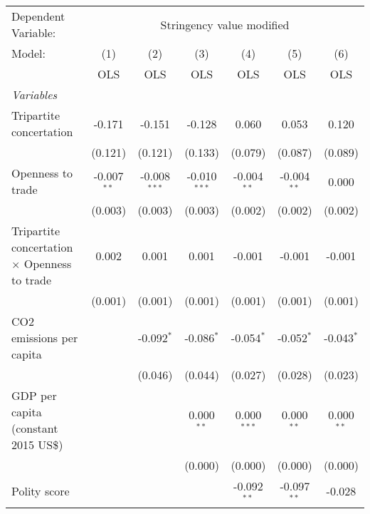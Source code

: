 
\begingroup
\centering
\begin{tabular}{lcccccc}
   \toprule
   Dependent Variable: & \multicolumn{6}{c}{Stringency value modified}\\
   Model:                                              & (1)           & (2)            & (3)            & (4)           & (5)           & (6)\\  
                                                       &  OLS          & OLS            & OLS            & OLS           & OLS           & OLS\\  
   \midrule
   \emph{Variables}\\
   Tripartite concertation                             & -0.171        & -0.151         & -0.128         & 0.060         & 0.053         & 0.120\\   
                                                       & (0.121)       & (0.121)        & (0.133)        & (0.079)       & (0.087)       & (0.089)\\   
   Openness to trade                                   & -0.007$^{**}$ & -0.008$^{***}$ & -0.010$^{***}$ & -0.004$^{**}$ & -0.004$^{**}$ & 0.000\\   
                                                       & (0.003)       & (0.003)        & (0.003)        & (0.002)       & (0.002)       & (0.002)\\   
   Tripartite concertation $\times$ Openness to trade  & 0.002         & 0.001          & 0.001          & -0.001        & -0.001        & -0.001\\   
                                                       & (0.001)       & (0.001)        & (0.001)        & (0.001)       & (0.001)       & (0.001)\\   
   CO2 emissions per capita                            &               & -0.092$^{*}$   & -0.086$^{*}$   & -0.054$^{*}$  & -0.052$^{*}$  & -0.043$^{*}$\\   
                                                       &               & (0.046)        & (0.044)        & (0.027)       & (0.028)       & (0.023)\\   
   GDP per capita (constant 2015 US\$)                 &               &                & 0.000$^{**}$   & 0.000$^{***}$ & 0.000$^{**}$  & 0.000$^{**}$\\   
                                                       &               &                & (0.000)        & (0.000)       & (0.000)       & (0.000)\\   
   Polity score                                        &               &                &                & -0.092$^{**}$ & -0.097$^{**}$ & -0.028\\   

\end{tabular}
